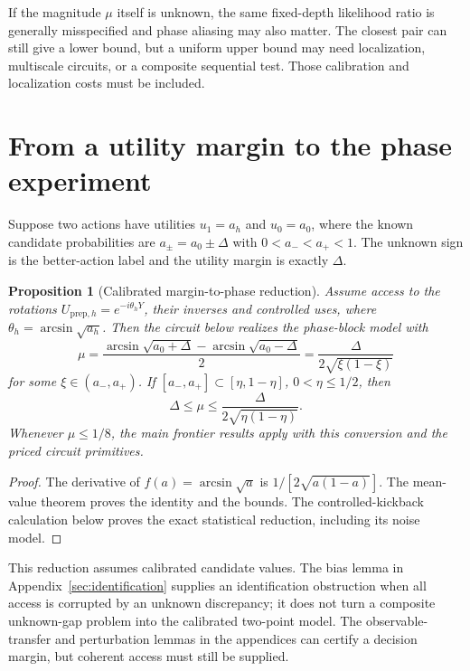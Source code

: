 \documentclass[11pt,a4paper]{article}
\newtheorem{proposition}[theorem]{Proposition}
\theoremstyle{definition}
\theoremstyle{remark}
\numberwithin{equation}{section}
\begin{document}
If the magnitude $\mu$ itself is unknown, the same fixed-depth likelihood
ratio is generally misspecified and phase aliasing may also matter.
The closest pair can still give a lower bound, but a uniform upper bound
may need localization, multiscale circuits, or a composite sequential test.
Those calibration and localization costs must be included.



\section{From a utility margin to the phase experiment}\label{sec:amplitude-case}
Suppose two actions have utilities $u_1=a_h$ and $u_0=a_0$, where the
known candidate probabilities are $a_\pm=a_0\pm\Delta$ with
$0<a_-<a_+<1$. The unknown sign is the better-action label and the
utility margin is exactly $\Delta$.

\begin{proposition}[Calibrated margin-to-phase reduction]\label{prop:encoding}
Assume access to the rotations $U_{\mathrm{prep},h}=e^{-i\theta_hY}$,
their inverses and controlled uses, where $\theta_h=\arcsin\sqrt{a_h}$.
Then the circuit below realizes the phase-block model with
\begin{equation}\label{eq:margin-conversion}
 \mu=\frac{\arcsin\sqrt{a_0+\Delta}-\arcsin\sqrt{a_0-\Delta}}2
 =\frac{\Delta}{2\sqrt{\xi(1-\xi)}}
\end{equation}
for some $\xi\in(a_-,a_+)$. If $[a_-,a_+]\subset[\eta,1-\eta]$,
$0<\eta\leq1/2$, then
\[
 \Delta\leq\mu\leq\frac{\Delta}{2\sqrt{\eta(1-\eta)}}.
\]
Whenever $\mu\leq1/8$, the main frontier results apply with this
conversion and the priced circuit primitives.
\end{proposition}
\begin{proof}
The derivative of $f(a)=\arcsin\sqrt a$ is
$1/[2\sqrt{a(1-a)}]$. The mean-value theorem proves the identity and
the bounds. The controlled-kickback calculation below proves the exact
statistical reduction, including its noise model.
\end{proof}

This reduction assumes calibrated candidate values. The bias lemma in
Appendix~\ref{sec:identification} supplies an identification obstruction
when all access is corrupted by an unknown discrepancy; it does not
turn a composite unknown-gap problem into the calibrated two-point model.
The observable-transfer and perturbation lemmas in the appendices can
certify a decision margin, but coherent access must still be supplied.
\end{document}
